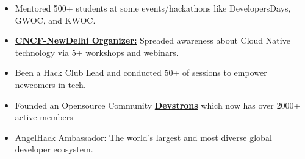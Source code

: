 \begin{itemize}
    \item Mentored 500+ students at some events/hackathons like DevelopersDays, GWOC, and KWOC.
    \item \href{https://community.cncf.io/delhi/}{\textbf{CNCF-NewDelhi Organizer:}}  Spreaded awareness about Cloud Native technology via 5+ workshops and webinars.
    \item Been a Hack Club Lead and conducted 50+ of sessions to empower newcomers in tech.
    \item Founded an Opensource Community \textbf{\href{https://github.com/devstrons}{Devstrons}} which now has over 2000+ active members
    \item AngelHack Ambassador: The world’s largest and most diverse global developer ecosystem.
\end{itemize}







